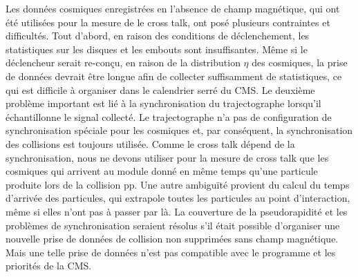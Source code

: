 
Les données cosmiques enregistrées en l'absence de champ magnétique, qui ont été utilisées pour la mesure de le cross talk, ont posé plusieurs contraintes et difficultés. Tout d'abord, en raison des conditions de déclenchement, les statistiques sur les disques et les embouts sont insuffisantes. Même si le déclencheur serait re-conçu, en raison de la distribution $\eta$ des cosmiques, la prise de données devrait être longue afin de collecter suffisamment de statistiques, ce qui est difficile à organiser dans le calendrier serré du CMS. Le deuxième problème important est lié à la synchronisation du trajectographe lorsqu'il échantillonne le signal collecté. Le trajectographe n'a pas de configuration de synchronisation spéciale pour les cosmiques et, par conséquent, la synchronisation des collisions est toujours utilisée. Comme le cross talk dépend de la synchronisation, nous ne devons utiliser pour la mesure de cross talk que les cosmiques qui arrivent au module donné en même temps qu’une particule produite lors de la collision pp. Une autre ambiguïté provient du calcul du temps d'arrivée des particules, qui extrapole toutes les particules au point d'interaction, même si elles n'ont pas à passer par là. La couverture de la pseudorapidité et les problèmes de synchronisation seraient résolus s'il était possible d'organiser une nouvelle prise de données de collision non supprimées sans champ magnétique. Mais une telle prise de données n'est pas compatible avec le programme et les priorités de la CMS.

